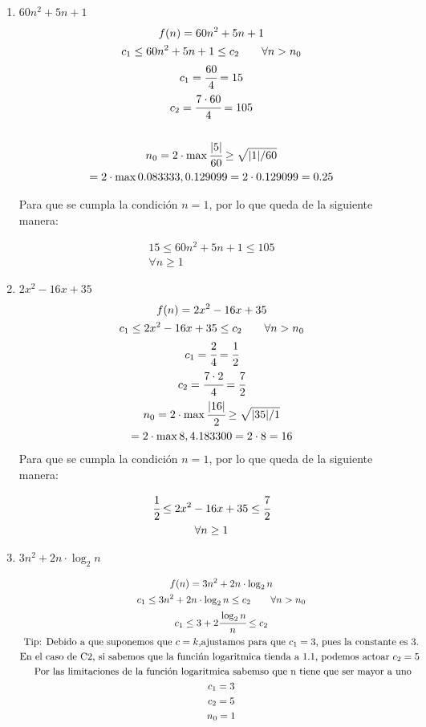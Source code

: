 \documentclass{article}
\begin{document}
\begin{enumerate}
    \item $60n^2 + 5n + 1 $
\begin{gather*} 
 f(n)=60n^2 + 5n + 1 \\ 
 c_1 \leq 60n^2 + 5n + 1 \leq c_2 \quad \quad\forall n>n_0\\
 c_1 = \cfrac{60}{4}=15\\
 c_2= \cfrac{7\cdot 60}{4}=105\\\\
 n_0 = 2\cdot\max{\cfrac{|5|}{60}\geq \sqrt{|1|/60 }}\\
 = 2\cdot\max{0.083333, 0.129099}
 = 2\cdot0.129099 = 0.25
 \end{gather*}

Para que se cumpla la condición $n=1$, por lo que queda de la siguiente manera:

\begin{gather*} 
 15 \leq 60n^2 + 5n + 1 \leq 105 \\
 \forall n \geq 1
 \end{gather*}

    \item $2x^2-16x +35$
\begin{gather*} 
 f(n)=2x^2-16x +35 \\ 
 c_1 \leq 2x^2-16x +35 \leq c_2 \quad \quad  \forall n>n_0\\
 c_1 = \cfrac{2}{4} = \cfrac{1}{2}\\
 c_2= \cfrac{7\cdot 2}{4}=\cfrac{7}{2}\\
 n_0 = 2\cdot\max{\cfrac{|16|}{2}\geq \sqrt{|35|/1 }}\\
 = 2\cdot\max{8, 4.183300}
 = 2\cdot 8 = 16
\end{gather*}
Para que se cumpla la condición $n=1$, por lo que queda de la siguiente manera:

\begin{gather*} 
 \cfrac{1}{2} \leq 2x^2-16x +35 \leq \cfrac{7}{2} \\
 \forall n \geq 1
 \end{gather*}


    \item $3n^2 + 2n \cdot \log_2 n$
    
\begin{gather*} 
 f(n)=3n^2 + 2n \cdot \log_2 n\\ 
 c_1 \leq 3n^2 + 2n \cdot \log_2 n \leq c_2\quad \quad\forall n>n_0\\
 c_1 \leq 3 + 2 \cfrac{\log_2 n }{n} \leq c_2 \\
 \text{Tip: Debido a que suponemos que $c=k$,ajustamos para que $c_1=3$, pues la constante es 3.} \\
 \text{En el caso de C2, si sabemos que la funcińn logaritmica tienda a 1.1, podemos actoar $c_2=5$ } \\
 \text{ Por las limitaciones de la función logaritmica sabemso que n tiene que ser mayor a uno} \\
 c_1 = 3\\
 c_2= 5\\
 n_0 = 1
\end{gather*}


\end{enumerate}
\end{document}
